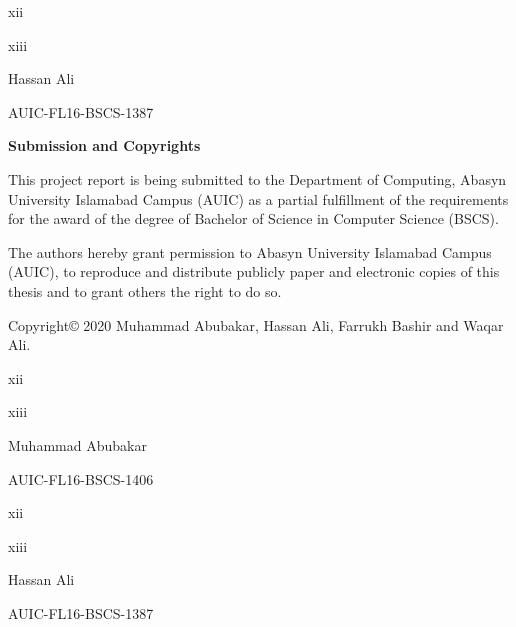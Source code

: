 \documentclass{article} %
\begin{document}
\noindent 

\noindent 

\noindent 

\noindent xii

\noindent xiii

\noindent 

\noindent 

\noindent 

\noindent Hassan Ali

\noindent AUIC-FL16-BSCS-1387 

\noindent 

\noindent 

\noindent 

\noindent 

\noindent 

\noindent 

\noindent 

\noindent \textbf{Submission and Copyrights}

\noindent This project report is being submitted to the Department of Computing, Abasyn University Islamabad Campus (AUIC) as a partial fulfillment of the requirements for the award of the degree of Bachelor of Science in Computer Science (BSCS).

\noindent The authors hereby grant permission to Abasyn University Islamabad Campus (AUIC), to reproduce and distribute publicly paper and electronic copies of this thesis and to grant others the right to do so.

\noindent Copyright{\copyright} 2020 Muhammad Abubakar, Hassan Ali, Farrukh Bashir and Waqar Ali.

\noindent 

\noindent xii

\noindent xiii

\noindent 

\noindent 

\noindent 

\noindent Muhammad Abubakar

\noindent AUIC-FL16-BSCS-1406

\noindent 

\noindent xii

\noindent xiii

\noindent 

\noindent 

\noindent 

\noindent Hassan Ali

\noindent AUIC-FL16-BSCS-1387

\noindent 
\end{document}
